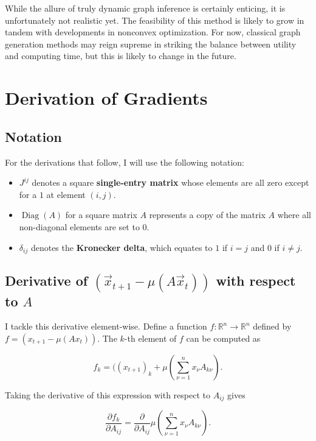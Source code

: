 \documentclass[12pt]{article}
\theoremstyle{definition}
\DeclareMathOperator{\Diag}{Diag}
\begin{document}
While the allure of truly dynamic graph inference is certainly enticing, it is unfortunately not realistic yet. The feasibility of this method is likely to grow in tandem with developments in nonconvex optimization. For now, classical graph generation methods may reign supreme in striking the balance between utility and computing time, but this is likely to change in the future.

\newpage

\appendix

\section{Derivation of Gradients}

\subsection{Notation}

For the derivations that follow, I will use the following notation:

\begin{itemize}
    \item $J^{ij}$ denotes a square \textbf{single-entry matrix} whose elements are all zero except for a $1$ at element $(i,j)$.
    \item $\Diag(A)$ for a square matrix $A$ represents a copy of the matrix $A$ where all non-diagonal elements are set to $0$.
    \item $\delta_{ij}$ denotes the \textbf{Kronecker delta}, which equates to $1$ if $i = j$ and $0$ if $i \neq j$.
\end{itemize}

\subsection{Derivative of $(\Vec{x}_{t+1} - \mu(A\Vec{x}_t))$ with respect to $A$}
\label{subsec:yTermDerivative}

I tackle this derivative element-wise. Define a function $f: \mathbb{R}^{n} \rightarrow \mathbb{R}^n$ defined by $f = (x_{t+1} - \mu(Ax_t))$. The $k$-th element of $f$ can be computed as 

\[
f_k = ((x_{t+1})_k + \mu(\sum_{\nu = 1}^{n} x_\nu A_{k\nu}).
\]

Taking the derivative of this expression with respect to $A_{ij}$ gives

\[
\frac{\partial f_k}{\partial A_{ij}} = \frac{\partial}{\partial A_{ij}} \mu(\sum_{\nu = 1}^{n} x_\nu A_{k\nu}).
\]
\end{document}
